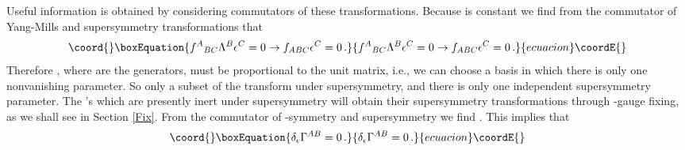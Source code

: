 \documentclass[12pt,a4paper]{article}
\begin{document}
Useful information is obtained by considering commutators of
these transformations.
Because \coordHE{} is constant we find from the commutator of
Yang-Mills and supersymmetry transformations that
\begin{equation}\coord{}\boxEquation{
      f^{A}{}_{BC}\Lambda^B\epsilon^C=0\to f_{ABC}\epsilon^C=0\,.
}{
      f^{A}{}_{BC}\Lambda^B\epsilon^C=0\to f_{ABC}\epsilon^C=0\,.
}{ecuacion}\coordE{}\end{equation}
Therefore \coordHE{}, where \coordHE{} are the
\coordHE{} generators, must be proportional to the unit
matrix, i.e., we can choose a basis in which there is only
one nonvanishing \myHighlight{$\epsilon$}\coordHE{} parameter.
So only a subset of the \coordHE{} transform under supersymmetry,
and there is only one independent supersymmetry parameter.
The \myHighlight{$\theta$}\coordHE{}'s which are presently
inert under supersymmetry will obtain their supersymmetry
transformations through \myHighlight{$\kappa$}\coordHE{}-gauge fixing, as we shall see
in Section \ref{Fix}. {From} the commutator of \myHighlight{$\kappa$}\coordHE{}-symmetry and
supersymmetry we find \coordHE{}. This implies that
\begin{equation}\coord{}\boxEquation{
  \delta_\epsilon \Gamma^{AB} = 0\,.
}{
  \delta_\epsilon \Gamma^{AB} = 0\,.
}{ecuacion}\coordE{}\end{equation}
\end{document}
